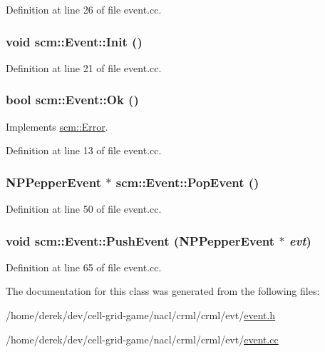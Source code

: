 Definition at line 26 of file event.cc.

\hypertarget{classscm_1_1_event_a2dfdf12d5b7918b2102e7ce1c4142ed3}{
\subsubsection[{Init}]{\setlength{\rightskip}{0pt plus 5cm}void scm::Event::Init ()}}
\label{classscm_1_1_event_a2dfdf12d5b7918b2102e7ce1c4142ed3}


Definition at line 21 of file event.cc.

\hypertarget{classscm_1_1_event_a95400a0d0218dfb664c028d1130a5d14}{
\subsubsection[{Ok}]{\setlength{\rightskip}{0pt plus 5cm}bool scm::Event::Ok ()}}
\label{classscm_1_1_event_a95400a0d0218dfb664c028d1130a5d14}


Implements \hyperlink{classscm_1_1_error_a2660b73f9671be3f286bed9d622a926a}{scm::Error}.



Definition at line 13 of file event.cc.

\hypertarget{classscm_1_1_event_aaa7905956b3d789fa16cc7a73490dc5e}{
\subsubsection[{PopEvent}]{\setlength{\rightskip}{0pt plus 5cm}NPPepperEvent $\ast$ scm::Event::PopEvent ()}}
\label{classscm_1_1_event_aaa7905956b3d789fa16cc7a73490dc5e}


Definition at line 50 of file event.cc.

\hypertarget{classscm_1_1_event_a1e1aa9fbe9b5e7e7c9b0ff8f0ba74cd2}{
\subsubsection[{PushEvent}]{\setlength{\rightskip}{0pt plus 5cm}void scm::Event::PushEvent (NPPepperEvent $\ast$ {\em evt})}}
\label{classscm_1_1_event_a1e1aa9fbe9b5e7e7c9b0ff8f0ba74cd2}


Definition at line 65 of file event.cc.



The documentation for this class was generated from the following files:\begin{DoxyCompactItemize}
\item 
/home/derek/dev/cell-\/grid-\/game/nacl/crml/crml/evt/\hyperlink{event_8h}{event.h}\item 
/home/derek/dev/cell-\/grid-\/game/nacl/crml/crml/evt/\hyperlink{event_8cc}{event.cc}\end{DoxyCompactItemize}
